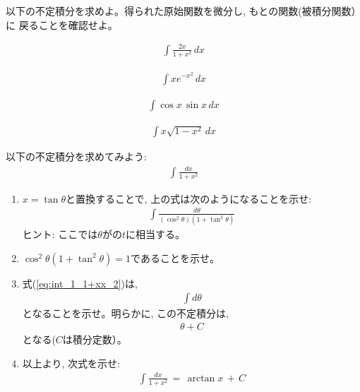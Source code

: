 \begin{q}\label{q:int_chikan0} 以下の不定積分を求めよ。得られた原始関数を微分し, もとの関数(被積分関数）に
戻ることを確認せよ。
\begin{edaenumerate}
\item \begin{eqnarray*}\int \frac{2x}{1+x^2}\, dx\end{eqnarray*}
\item \begin{eqnarray*}\int xe^{-x^2}\, dx\end{eqnarray*}
\item \begin{eqnarray*}\int \cos x\,\sin x\, dx\end{eqnarray*}
\item \begin{eqnarray*}\int x \sqrt{1-x^2}\, dx\end{eqnarray*}
\end{edaenumerate}\end{q}
\vspace{0.3cm}

\begin{q}\label{q:int_chikan2} 以下の不定積分を求めてみよう:
\begin{eqnarray}\int \frac{dx}{1+x^2}\label{eq:int_1_1+xx_1}\end{eqnarray}
\begin{enumerate}
\item $x=\tan \theta$と置換することで, 上の式は次のようになることを示せ:
\begin{eqnarray}\int \frac{d\theta}{(\cos^2\theta)(1+\tan^2\theta)}\label{eq:int_1_1+xx_2}\end{eqnarray}
ヒント: ここでは$\theta$がの$t$に相当する。
\item $\cos^2\theta(1+\tan^2\theta)=1$であることを示せ。
\item 式(\ref{eq:int_1_1+xx_2})は, 
\begin{eqnarray*}\int d\theta\end{eqnarray*}
となることを示せ。明らかに, この不定積分は, 
\begin{eqnarray}\theta+C\label{eq:int_1_1+xx_30}\end{eqnarray}
となる($C$は積分定数）。
\item 以上より, 次式を示せ:
\begin{eqnarray}\int \frac{dx}{1+x^2}\,=\,\arctan x\,+\,C\label{eq:int_1_1+xx_3}\end{eqnarray}
\end{enumerate}\end{q}

